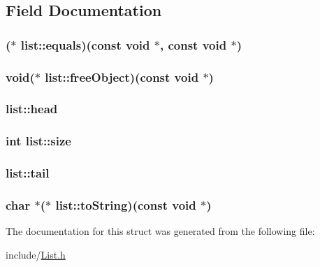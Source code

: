 \subsection{Field Documentation}
\hypertarget{structlist_a5855acf2ffa2b92d9cb0cecb48c06fb3}{
\subsubsection[{equals}]{($\ast$ list\-::equals)(const void $\ast$, const void $\ast$)}}\label{structlist_a5855acf2ffa2b92d9cb0cecb48c06fb3}
\hypertarget{structlist_a04091cb910e425d1226562197fe0bf8c}{
\subsubsection[{free\-Object}]{\setlength{\rightskip}{0pt plus 5cm}void($\ast$ list\-::free\-Object)(const void $\ast$)}}\label{structlist_a04091cb910e425d1226562197fe0bf8c}
\hypertarget{structlist_a357a56cbe66297fb5cc5cd8ba9fa6cf4}{
\subsubsection[{head}]{ list\-::head}}\label{structlist_a357a56cbe66297fb5cc5cd8ba9fa6cf4}
\hypertarget{structlist_a3b03adad0c0429bae9493667ff366dc2}{
\subsubsection[{size}]{\setlength{\rightskip}{0pt plus 5cm}int list\-::size}}\label{structlist_a3b03adad0c0429bae9493667ff366dc2}
\hypertarget{structlist_a7fba27040dab68e2d6acc2885b6df167}{
\subsubsection[{tail}]{ list\-::tail}}\label{structlist_a7fba27040dab68e2d6acc2885b6df167}
\hypertarget{structlist_a42d6b0844dfb82a44cbeaab4f7ec0877}{
\subsubsection[{to\-String}]{\setlength{\rightskip}{0pt plus 5cm}char $\ast$($\ast$ list\-::to\-String)(const void $\ast$)}}\label{structlist_a42d6b0844dfb82a44cbeaab4f7ec0877}


The documentation for this struct was generated from the following file\-:\begin{DoxyCompactItemize}
\item 
include/\hyperlink{include_2List_8h}{List.\-h}\end{DoxyCompactItemize}
